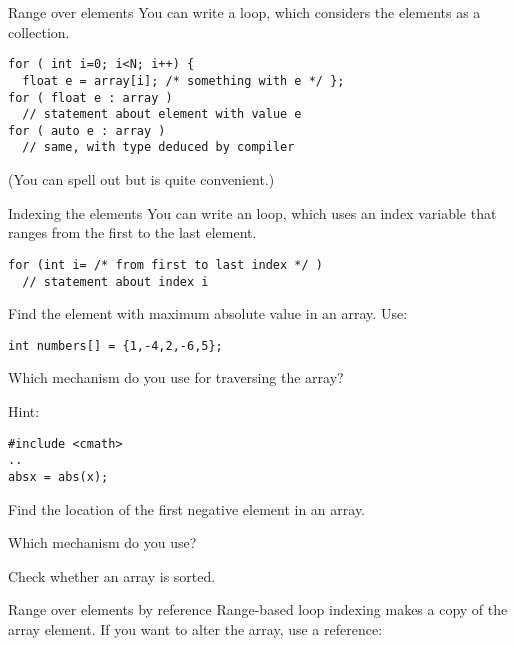 \begin{block}{Range over elements}
  \label{sl:array-range}
  You can write a  loop, which
  considers the elements as a collection.
\begin{verbatim}
for ( int i=0; i<N; i++) {
  float e = array[i]; /* something with e */ };
for ( float e : array )
  // statement about element with value e
for ( auto e : array )
  // same, with type deduced by compiler
\end{verbatim}

\end{block}

(You can spell out  but  is
quite convenient.)

\begin{block}{Indexing the elements}
  \label{sl:index-range}
  You can write an  loop, which uses an
  index variable that ranges from the first to the last element.
\begin{verbatim}
for (int i= /* from first to last index */ )
  // statement about index i
\end{verbatim}
\end{block}

\begin{exercise}
  \label{ex:array-max}
  Find the element with maximum absolute value in an array. Use:
\begin{verbatim}
int numbers[] = {1,-4,2,-6,5};
\end{verbatim}
Which mechanism do you use for traversing the array?

Hint:
\begin{verbatim}
#include <cmath>
..
absx = abs(x);
\end{verbatim}
\end{exercise}

\begin{exercise}
  \label{ex:array-maxidx}
  Find the location of the first negative element in an array.

  Which mechanism do you use?
\end{exercise}

\begin{exercise}
  \label{ex:array-sorted}
  Check whether an array is sorted.
\end{exercise}

\begin{block}{Range over elements by reference}
  \label{sl:array-range-ref}
  Range-based loop indexing makes a copy of the array element. If you
  want to alter the array, use a reference:
\end{block}

